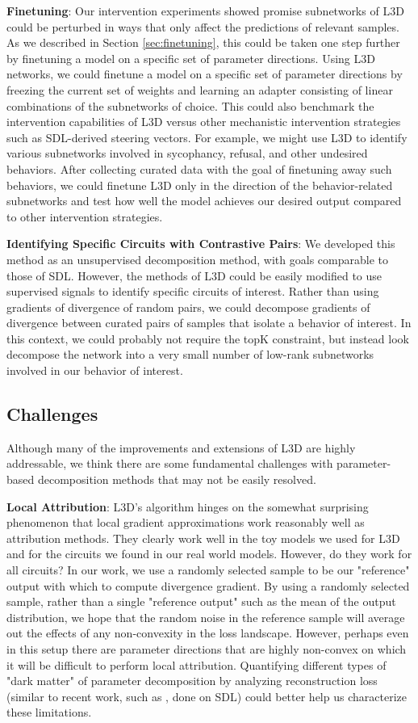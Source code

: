 \documentclass{article}
\theoremstyle{plain}
\theoremstyle{definition}
\theoremstyle{remark}
\begin{document}
\textbf{Finetuning}: Our intervention experiments showed promise subnetworks of L3D could be perturbed in ways that only affect the predictions of relevant samples. As we described in Section \ref{sec:finetuning}, this could be taken one step further by finetuning a model on a specific set of parameter directions. Using L3D networks, we could finetune a model on a specific set of parameter directions by freezing the current set of weights and learning an adapter consisting of linear combinations of the subnetworks of choice. This could also benchmark the intervention capabilities of L3D versus other mechanistic intervention strategies such as SDL-derived steering vectors. For example, we might use L3D to identify various subnetworks involved in sycophancy, refusal, and other undesired behaviors. After collecting curated data with the goal of finetuning away such behaviors, we could finetune L3D only in the direction of the behavior-related subnetworks and test how well the model achieves our desired output compared to other intervention strategies. 

\textbf{Identifying Specific Circuits with Contrastive Pairs}:
We developed this method as an unsupervised decomposition method, with goals comparable to those of SDL. However, the methods of L3D could be easily modified to use supervised signals to identify specific circuits of interest. Rather than using gradients of divergence of random pairs, we could decompose gradients of divergence between curated pairs of samples that isolate a behavior of interest. In this context, we could probably not require the topK constraint, but instead look decompose the network into a very small number of low-rank subnetworks involved in our behavior of interest. 

\subsection{Challenges}
Although many of the improvements and extensions of L3D are highly addressable, we think there are some fundamental challenges with parameter-based decomposition methods that may not be easily resolved.

\textbf{Local Attribution}: L3D's algorithm hinges on the somewhat surprising phenomenon that local gradient approximations work reasonably well as attribution methods. They clearly work well in the toy models we used for L3D and for the circuits we found in our real world models. However, do they work for all circuits? In our work, we use a randomly selected sample to be our "reference" output with which to compute divergence gradient. By using a randomly selected sample, rather than a single "reference output" such as the mean of the output distribution, we hope that the random noise in the reference sample will average out the effects of any non-convexity in the loss landscape.  However, perhaps even in this setup there are parameter directions that are highly non-convex on which it will be difficult to perform local attribution. Quantifying different types of "dark matter" of parameter decomposition by analyzing reconstruction loss (similar to recent work, such as \cite{engels2024decomposing}, done on SDL) could better help us characterize these limitations.
\end{document}
